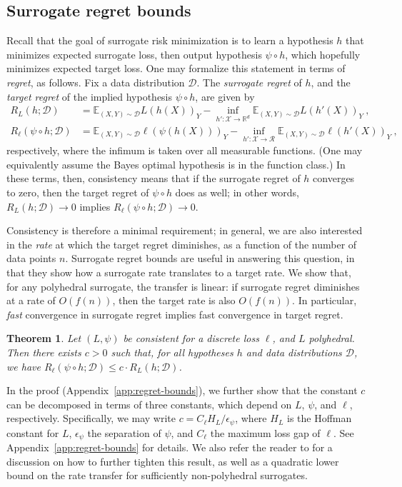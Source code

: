 \documentclass[11pt]{article}
\newcommand{\reals}{\mathbb{R}}
\newcommand{\D}{\mathcal{D}}
\newcommand{\E}{\mathbb{E}}
\newcommand{\R}{\mathcal{R}}
\newcommand{\X}{\mathcal{X}}
\newtheorem{theorem}{Theorem}
\begin{document}
\subsection{Surrogate regret bounds}\label{subsec:regret-bounds}
Recall that the goal of surrogate risk minimization is to learn a hypothesis $h$ that minimizes expected surrogate loss, then output hypothesis $\psi \circ h$, which hopefully minimizes expected target loss.
One may formalize this statement in terms of \emph{regret}, as follows.
Fix a data distribution $\D$.
The \emph{surrogate regret} of $h$, and the \emph{target regret} of the implied hypothesis $\psi \circ h$, are given by
\begin{align*}
  R_L(h;\D) &= \E_{(X,Y)\sim\D} L(h(X))_Y - \inf_{h':\X\to\reals^d} \E_{(X,Y)\sim\D} L(h'(X))_Y~,
  \\
  R_\ell(\psi\circ h;\D) &= \E_{(X,Y)\sim\D} \ell(\psi(h(X)))_Y - \inf_{h':\X\to\R} \E_{(X,Y)\sim\D} \ell(h'(X))_Y~,
\end{align*}
respectively,
where the infimum is taken over all measurable functions.
(One may equivalently assume the Bayes optimal hypothesis is in the function class.)
In these terms, then, consistency means that if the surrogate regret of $h$ converges to zero, then the target regret of $\psi \circ h$ does as well; in other words, $R_L(h;\D) \to 0$ implies $R_{\ell}(\psi \circ h;\D) \to 0$.

Consistency is therefore a minimal requirement; in general, we are also interested in the \emph{rate} at which the target regret diminishes, as a function of the number of data points $n$.
Surrogate regret bounds are useful in answering this question, in that they show how a surrogate rate translates to a target rate.
We show that, for any polyhedral surrogate, the transfer is linear: if surrogate regret diminishes at a rate of $O(f(n))$, then the target rate is also $O(f(n))$.
In particular, \emph{fast} convergence in surrogate regret implies fast convergence in target regret.
\begin{theorem}
  Let $(L,\psi)$ be consistent for a discrete loss $\ell$, and $L$ polyhedral.
  Then there exists $c > 0$ such that, for all hypotheses $h$ and data distributions $\D$, we have $R_{\ell}(\psi \circ h;\D) \leq c \cdot R_L(h;\D)$.
\end{theorem}
In the proof (Appendix~\ref{app:regret-bounds}), we further show that the constant $c$ can be decomposed in terms of three constants, which depend on $L$, $\psi$, and $\ell$, respectively.
Specifically, we may write $c = C_\ell H_L / \epsilon_\psi$, where $H_L$ is the Hoffman constant for $L$, $\epsilon_\psi$ the separation of $\psi$, and $C_\ell$ the maximum loss gap of $\ell$.
See Appendix~\ref{app:regret-bounds} for details.
We also refer the reader to \citet{frongillo2021surrogate} for a discussion on how to further tighten this result, as well as a quadratic lower bound on the rate transfer for sufficiently non-polyhedral surrogates.
\end{document}
